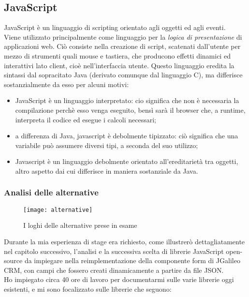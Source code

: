 \subsection{JavaScript}
JavaScript è un linguaggio di scripting orientato agli oggetti ed agli eventi.\\
Viene utilizzato principalmente come linguaggio per la \emph{logica di presentazione} di applicazioni web. Ciò consiste nella creazione di \gls{script}, scatenati dall'utente per mezzo di strumenti quali mouse e tastiera, che producono effetti dinamici ed interattivi lato client, cioè nell'interfaccia utente.
Questo linguaggio eredita la sintassi dal sopracitato Java (derivato comunque dal linguaggio C), ma differisce sostanzialmente da esso per alcuni motivi:
\begin{itemize}
	\item JavaScript è un linguaggio interpretato: cio significa che non è necessaria la compilazione perchè esso venga eseguito, bensì sarà il browser che, a runtime, interpreta il codice ed esegue i calcoli necessari;
	\item a differenza di Java, javascript è debolmente tipizzato: ciò significa che una variabile può assumere diversi tipi, a seconda del suo utilizzo;
	\item Javascript è un linguaggio debolmente orientato all'ereditarietà tra oggetti, altro aspetto dai cui differisce in maniera sostanziale da Java. 
\end{itemize}

\newpage

\subsubsection{Analisi delle alternative}

\begin{figure}[h]
	\centering
	\texttt{[image: alternative]}
	\caption{I loghi delle alternative prese in esame}
\end{figure}

Durante la mia esperienza di stage era richiesto, come illustrerò dettagliatamente nel capitolo successivo, l'analisi e la successiva scelta di librerie JavaScript open-source da impiegare nella reimplementazione della componente form di JGalileo CRM, con campi che fossero creati dinamicamente a partire da file JSON. \\ 
Ho impiegato circa 40 ore di lavoro per documentarmi sulle varie librerie oggi esistenti, e mi sono focalizzato sulle librerie che seguono:
